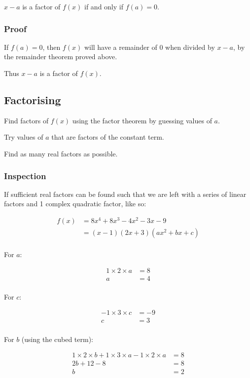 \documentclass[a4paper,11pt]{report}
\begin{document}
$x - a$ is a factor of $f(x)$ if and only if $f(a) = 0$.

\subsubsection{Proof}

If $f(a) = 0$, then $f(x)$ will have a remainder of 0 when divided by $x - a$,
by the remainder theorem proved above.

Thus $x - a$ is a factor of $f(x)$.

\subsection{Factorising}

Find factors of $f(x)$ using the factor theorem by guessing values of $a$.

Try values of $a$ that are factors of the constant term.

Find as many real factors as possible.

\subsubsection{Inspection}

If sufficient real factors can be found such that we are left with a series of
linear factors and 1 complex quadratic factor, like so:

$$
\begin{aligned}
f(x) & = 8x^4 + 8x^3 - 4x^2 - 3x - 9 \\
& = (x - 1)(2x + 3)(ax^2 + bx + c) \\
\end{aligned}
$$

For $a$:

$$
\begin{aligned}
1 \times 2 \times a & = 8 \\
a & = 4 \\
\end{aligned}
$$

For $c$:

$$
\begin{aligned}
-1 \times 3 \times c & = -9 \\
c & = 3 \\
\end{aligned}
$$

For $b$ (using the cubed term):

$$
\begin{aligned}
1 \times 2 \times b + 1 \times 3 \times a - 1 \times 2 \times a & = 8 \\
2b + 12 - 8 & = 8 \\
b & = 2 \\
\end{aligned}
$$
\end{document}
